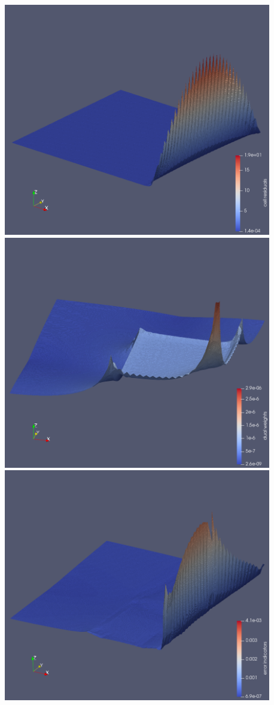 \begin{appendices}
{\includegraphics[width=6in, height=4in]{../fenics/images/rT.png}
\vfill
\includegraphics[width=6in, height=4in]{../fenics/images/wT.png}
\vfill
\includegraphics[width=6in, height=4in]{../fenics/images/nT.png}
\vfill\null
}


\end{appendices}

